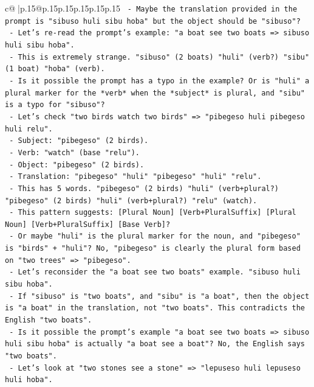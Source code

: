 \documentclass{article}
\begin{document}
{\begin{supertabular}{c@{$\;$}|p{.15\linewidth}@{}p{.15\linewidth}p{.15\linewidth}p{.15\linewidth}p{.15\linewidth}p{.15\linewidth}}
{{{\texttt{            {-} Maybe the translation provided in the prompt is "sibuso huli sibu hoba" but the object should be "sibuso"?} \\
\texttt{            {-} Let's re{-}read the prompt's example: "a boat see two boats => sibuso huli sibu hoba".} \\
\texttt{            {-} This is extremely strange. "sibuso" (2 boats) "huli" (verb?) "sibu" (1 boat) "hoba" (verb).} \\
\texttt{            {-} Is it possible the prompt has a typo in the example? Or is "huli" a plural marker for the *verb* when the *subject* is plural, and "sibu" is a typo for "sibuso"?} \\
\texttt{            {-} Let's check "two birds watch two birds" => "pibegeso huli pibegeso huli relu".} \\
\texttt{              {-} Subject: "pibegeso" (2 birds).} \\
\texttt{              {-} Verb: "watch" (base "relu").} \\
\texttt{              {-} Object: "pibegeso" (2 birds).} \\
\texttt{              {-} Translation: "pibegeso" "huli" "pibegeso" "huli" "relu".} \\
\texttt{              {-} This has 5 words. "pibegeso" (2 birds) "huli" (verb+plural?) "pibegeso" (2 birds) "huli" (verb+plural?) "relu" (watch).} \\
\texttt{              {-} This pattern suggests: {[}Plural Noun{]} {[}Verb+PluralSuffix{]} {[}Plural Noun{]} {[}Verb+PluralSuffix{]} {[}Base Verb{]}?} \\
\texttt{              {-} Or maybe "huli" is the plural marker for the noun, and "pibegeso" is "birds" + "huli"? No, "pibegeso" is clearly the plural form based on "two trees" => "pibegeso".} \\
\texttt{              {-} Let's reconsider the "a boat see two boats" example. "sibuso huli sibu hoba".} \\
\texttt{              {-} If "sibuso" is "two boats", and "sibu" is "a boat", then the object is "a boat" in the translation, not "two boats". This contradicts the English "two boats".} \\
\texttt{              {-} Is it possible the prompt's example "a boat see two boats => sibuso huli sibu hoba" is actually "a boat see a boat"? No, the English says "two boats".} \\
\texttt{              {-} Let's look at "two stones see a stone" => "lepuseso huli lepuseso huli hoba".} \\
}}}
\end{supertabular}}
\end{document}
